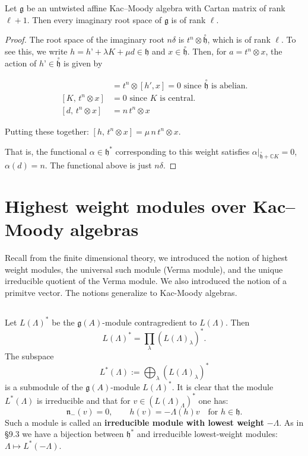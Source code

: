\documentclass[12pt]{article}
\begin{document}
\begin{corollary}
    Let $\mathfrak{g}$ be an untwisted affine Kac–Moody algebra with Cartan matrix of rank $\ell+1$. Then every imaginary root space of $\mathfrak{g}$ is of rank $\ell$.
\end{corollary}

\begin{proof}
    The root space of the imaginary root $n\delta$ is $t^n \otimes \overset{\circ}{\mathfrak{h}}$, which is of rank $\ell$. To see this, we write  $h = h’ + \lambda K + \mu d \in \mathfrak{h}$ and $x \in \overset{\circ}{\mathfrak{h}}$. Then, for $a = t^n \otimes x$, the action of $h’ \in \overset{\circ}{\mathfrak{h}}$ is given by

\begin{align*}
[h',\, t^n \otimes x]
&= t^n \otimes [h',x] = 0 \text{ since $\overset{\circ}{\mathfrak{h}}$ is abelian.}\\
[K,\, t^n \otimes x] &= 0 \text{ since $K$ is central.}\\
[d,\, t^n \otimes x] &= n\,t^n \otimes x
\end{align*}

Putting these together:
$[h,\, t^n \otimes x] = \mu\,n\,t^n \otimes x$.

That is, the functional $\alpha \in \mathfrak{h}^*$ corresponding to this weight satisfies $\alpha|_{\overset{\circ}{\mathfrak{h}} + \mathbb{C}K} = 0$,
$\alpha(d) = n$. The functional above is just $n\delta$.
\end{proof}

\section{Highest weight modules over Kac–Moody algebras}
Recall from the finite dimensional theory, we introduced the notion of highest weight modules, the universal such module (Verma module), and the unique irreducible quotient of the Verma module. We also introduced the notion of a primitve vector. The notions generalize to Kac-Moody algebras.
\subsection{}
Let $L(\Lambda)^*$ be the $\mathfrak{g}(A)$-module contragredient to $L(\Lambda)$. 
Then 
\[
L(\Lambda)^* = \prod_{\lambda} (L(\Lambda)_\lambda)^*.
\]
The subspace
\[
L^*(\Lambda) := \bigoplus_{\lambda} (L(\Lambda)_\lambda)^*
\]
is a submodule of the $\mathfrak{g}(A)$-module $L(\Lambda)^*$. 
It is clear that the module $L^*(\Lambda)$ is irreducible and that for 
$v \in (L(\Lambda)_\Lambda)^*$ one has:
\[
\mathfrak{n}_-(v) = 0, 
\qquad 
h(v) = -\Lambda(h)v \quad \text{for } h \in \mathfrak{h}.
\]
Such a module is called an \textbf{irreducible module with lowest weight} $-\Lambda$.
As in §9.3 we have a bijection between $\mathfrak{h}^*$ and irreducible lowest-weight
modules: $\Lambda \mapsto L^*(-\Lambda)$.
\end{document}
